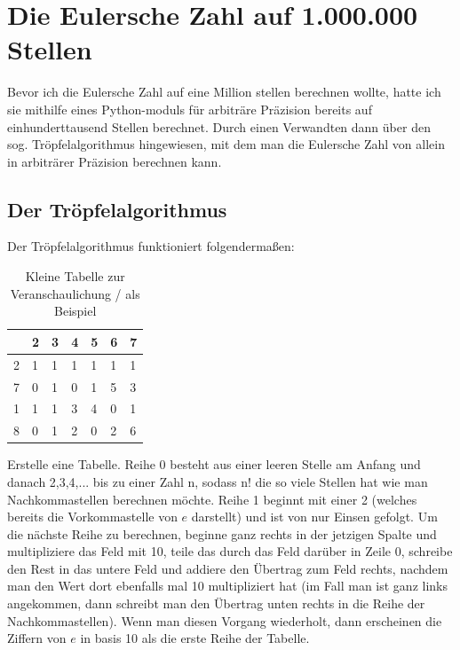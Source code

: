 \section{Die Eulersche Zahl auf 1.000.000 Stellen}
Bevor ich die Eulersche Zahl auf eine Million stellen berechnen wollte, hatte ich sie mithilfe eines Python-moduls für arbiträre Präzision bereits auf einhunderttausend Stellen berechnet. Durch einen Verwandten dann über den sog. Tröpfelalgorithmus hingewiesen, mit dem man die Eulersche Zahl von allein in arbiträrer Präzision berechnen kann.
\subsection{Der Tröpfelalgorithmus}
Der Tröpfelalgorithmus funktioniert folgendermaßen:
\begin{table}[h]
\centering
\begin{tabular}{|l|llllll|}
\hline
\rowcolor[HTML]{CBCEFB} 
  & 2 & 3 & 4 & 5 & 6 & 7 \\ \hline
2 & 1 & 1 & 1 & 1 & 1 & 1 \\
\rowcolor[HTML]{DAE8FC} 
7 & 0 & 1 & 0 & 1 & 5 & 3 \\
1 & 1 & 1 & 3 & 4 & 0 & 1 \\
\rowcolor[HTML]{DAE8FC} 
8 & 0 & 1 & 2 & 0 & 2 & 6 \\ \hline
\end{tabular}
\caption{Kleine Tabelle zur Veranschaulichung / als Beispiel}
\end{table}
\par Erstelle eine Tabelle. Reihe 0 besteht aus einer leeren Stelle am Anfang und danach 2,3,4,... bis zu einer Zahl n, sodass n! die so viele Stellen hat wie man Nachkommastellen berechnen möchte. Reihe 1 beginnt mit einer 2 (welches bereits die Vorkommastelle von $e$ darstellt) und ist von nur Einsen gefolgt. Um die nächste Reihe zu berechnen, beginne ganz rechts in der jetzigen Spalte und multipliziere das Feld mit 10, teile das durch das Feld darüber in Zeile 0, schreibe den Rest in das untere Feld und addiere den Übertrag zum Feld rechts, nachdem man den Wert dort ebenfalls mal 10 multipliziert hat (im Fall man ist ganz links angekommen, dann schreibt man den Übertrag unten rechts in die Reihe der Nachkommastellen). Wenn man diesen Vorgang wiederholt, dann erscheinen die Ziffern von $e$ in basis 10 als die erste Reihe der Tabelle.
